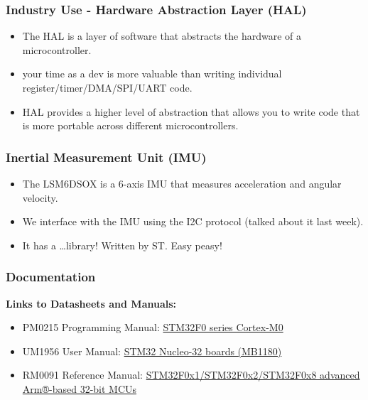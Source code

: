 \documentclass{beamer}
\begin{document}
\begin{frame}
    \frametitle{Industry Use - Hardware Abstraction Layer (HAL)}
    \begin{itemize}
      \item The HAL is a layer of software that abstracts the hardware of a microcontroller.
      \item your time as a dev is more valuable than writing individual register/timer/DMA/SPI/UART code.
      \item HAL provides a higher level of abstraction that allows you to write code that is more portable across different microcontrollers.
    \end{itemize}
\end{frame}


\begin{frame}
    \frametitle{Inertial Measurement Unit (IMU)}
    \begin{itemize}
      \item The LSM6DSOX is a 6-axis IMU that measures acceleration and angular velocity.
      \item We interface with the IMU using the I2C protocol (talked about it last week).
      \item It has a \dots library! Written by ST. Easy peasy!
    \end{itemize}
\end{frame}

\begin{frame}
    \frametitle{Documentation}
    \textbf{Links to Datasheets and Manuals:}
    \begin{itemize}
        \item PM0215 Programming Manual: \href{https://www.st.com/resource/en/programming_manual/pm0215-stm32f0-series-cortexm0-programming-manual-stmicroelectronics.pdf} {STM32F0 series Cortex-M0}
        \item UM1956 User Manual: \href{https://www.st.com/resource/en/user_manual/dm00231744-stm32-nucleo-32-boards-mb1180-stmicroelectronics.pdf}{STM32 Nucleo-32 boards (MB1180)}
        \item RM0091 Reference Manual: \href{https://www.st.com/resource/en/reference_manual/rm0091-stm32f0x1stm32f0x2stm32f0x8-advanced-armbased-32bit-mcus-stmicroelectronics.pdf}{STM32F0x1/STM32F0x2/STM32F0x8 advanced Arm®-based 32-bit MCUs}
    \end{itemize}
\end{frame}
\end{document}

